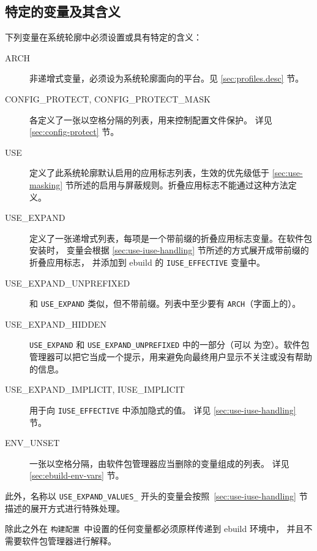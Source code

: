 \subsection{特定的变量及其含义}
\label{sec:specific-variables}
下列变量在系统轮廓中必须设置或具有特定的含义：
\begin{description}
\item[ARCH] 非递增式变量，必须设为系统轮廓面向的平台。见 \ref{sec:profiles.desc} 节。
\item[CONFIG_PROTECT, CONFIG_PROTECT_MASK] 各定义了一张以空格分隔的列表，用来控制配置文件保护。
    详见 \ref{sec:config-protect} 节。
\item[USE] 定义了此系统轮廓默认启用的应用标志列表，生效的优先级低于 \ref{sec:use-masking}
    节所述的启用与屏蔽规则。折叠应用标志不能通过这种方法定义。
\item[USE_EXPAND] 定义了一张递增式列表，每项是一个带前缀的折叠应用标志变量。在软件包安装时，
    变量会根据 \ref{sec:use-iuse-handling} 节所述的方式展开成带前缀的折叠应用标志，
    并添加到 ebuild 的 \texttt{IUSE_EFFECTIVE} 变量中。
\item[USE_EXPAND_UNPREFIXED] 和 \texttt{USE_EXPAND} 类似，但不带前缀。列表中至少要有
    \texttt{ARCH}（字面上的）。
\item[USE_EXPAND_HIDDEN] \texttt{USE_EXPAND} 和 \texttt{USE_EXPAND_UNPREFIXED} 中的一部分（可以
    为空）。软件包管理器可以把它当成一个提示，用来避免向最终用户显示不关注或没有帮助的信息。
\item[USE_EXPAND_IMPLICIT, IUSE_IMPLICIT] 用于向 \texttt{IUSE_EFFECTIVE} 中添加隐式的值。
    详见 \ref{sec:use-iuse-handling} 节。
\item[ENV_UNSET] 一张以空格分隔，由软件包管理器应当删除的变量组成的列表。
    详见 \ref{sec:ebuild-env-vars} 节。
\end{description}

此外，名称以 \texttt{USE_EXPAND_VALUES_} 开头的变量会按照~\ref{sec:use-iuse-handling}
节描述的展开方式进行特殊处理。

除此之外在 \texttt{构建配置}\ 中设置的任何变量都必须原样传递到 ebuild 环境中，
并且不需要软件包管理器进行解释。


